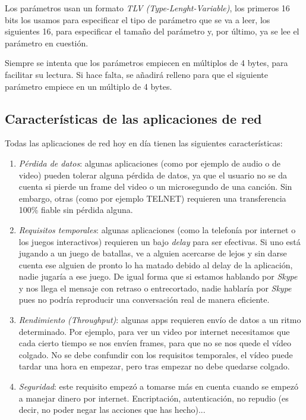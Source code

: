 \documentclass[10pt,a4paper,spanish]{report}
\begin{document}
Los parámetros usan un formato \textit{\textcolor{tema2}{TLV (Type-Lenght-Variable)}}, los primeros 16 bits los usamos para especificar el tipo de parámetro que se va a leer, los siguientes 16, para especificar el tamaño del parámetro y, por último, ya se lee el parámetro en cuestión.



Siempre se intenta que los parámetros empiecen en múltiplos de 4 bytes, para facilitar su lectura. Si hace falta, se añadirá relleno para que el siguiente parámetro empiece en un múltiplo de 4 bytes.

\subsection{\textcolor{tema2}Características de las aplicaciones de red}
Todas las aplicaciones de red hoy en día tienen las siguientes características:
\begin{enumerate}[\color{tema2}{$\bigstar$}]
  \item \textit{\textcolor{tema2}{Pérdida de datos}}: algunas aplicaciones (como por ejemplo de audio o de video) pueden tolerar alguna pérdida de datos, ya que el usuario no se da cuenta si pierde un frame del video o un microsegundo de una canción. Sin embargo, otras (como por ejemplo TELNET) requieren una transferencia 100\% fiable sin pérdida alguna.

  \item \textit{\textcolor{tema2}{Requisitos temporales}}: algunas aplicaciones (como la telefonía por internet o los juegos interactivos) requieren un bajo \textit{\textcolor{tema2}{delay}} para ser efectivas. Si uno está jugando a un juego de batallas, ve a alguien acercarse de lejos y sin darse cuenta ese alguien de pronto lo ha matado debido al delay de la aplicación, nadie jugaría a ese juego. De igual forma que si estamos hablando por \textit{\textcolor{tema2}{Skype}} y nos llega el mensaje con retraso o entrecortado, nadie hablaría por \textit{\textcolor{tema2}{Skype}} pues no podría reproducir una conversación real de manera eficiente.

  \item \textit{\textcolor{tema2}{Rendimiento (Throughput)}}: algunas apps requieren envío de datos a un ritmo determinado. Por ejemplo, para ver un video por internet necesitamos que cada cierto tiempo se nos envíen frames, para que no se nos quede el vídeo colgado. No se debe confundir con los requisitos temporales, el vídeo puede tardar una hora en empezar, pero tras empezar no debe quedarse colgado.

  \item \textit{\textcolor{tema2}{Seguridad}}: este requisito empezó a tomarse más en cuenta cuando se empezó a manejar dinero por internet. Encriptación, autenticación, no repudio (es decir, no poder negar las acciones que has hecho)... 
\end{enumerate}
\end{document}
